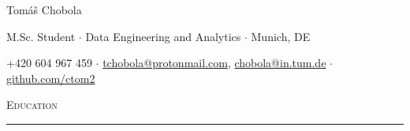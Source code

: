 \documentclass[10pt]{article}
\begin{document}
\begin{center}
    \begin{huge}
        Tomáš Chobola\\
    \end{huge}
\end{center}
\vspace{-1em}
\begin{center}
    \begin{small}
        M.Sc. Student $\cdot$ Data Engineering and Analytics $\cdot$ Munich, DE\\
    \end{small}
\end{center}
\vspace{-1em}
\begin{center}
    \begin{small}
        +420 604 967 459
        $\cdot$ 
        \href{mailto:tchobola@protonmail.com}{tchobola@protonmail.com}, \href{mailto:chobola@in.tum.de}{chobola@in.tum.de}
        $\cdot$
        \href{https://github.com/ctom2}{github.com/ctom2}\\
    \end{small}
\end{center}


\begin{Large}
    \textsc{Education}
    \vspace{0.4em}
    \hrule
    \vspace{0.4em}
\end{Large}
\end{document}
